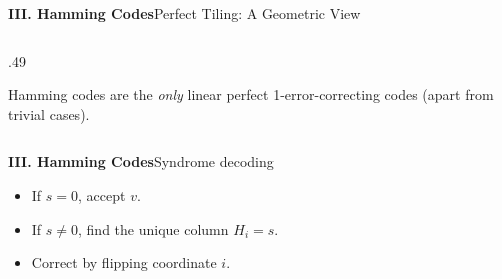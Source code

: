 \begin{frame}{\textbf{III. Hamming Codes}}{Perfect Tiling: A Geometric View}
\begin{columns}[T,onlytextwidth]
\begin{column}{.49\textwidth}

    \medskip
    Hamming codes are the \emph{only} linear perfect 1-error-correcting codes (apart from trivial cases).
  \end{column}
\end{columns}
\end{frame}

\begin{frame}{\textbf{III. Hamming Codes}}{Syndrome decoding}
\small
{}
\begin{itemize}
  \item If $s=0$, accept $v$.
  \item If $s\ne0$, find the unique column $H_i=s$.
  \item Correct by flipping coordinate $i$.
\end{itemize}
\end{frame}

